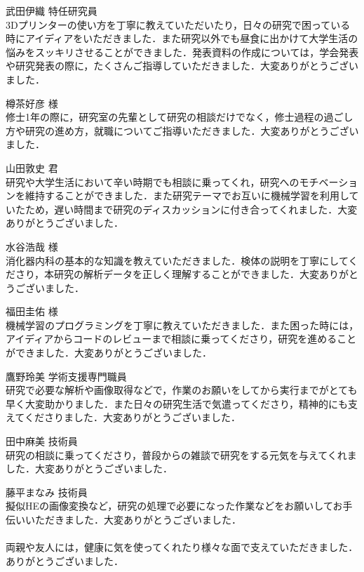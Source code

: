 武田伊織 特任研究員\\
3Dプリンターの使い方を丁寧に教えていただいたり，日々の研究で困っている時にアイディアをいただきました．また研究以外でも昼食に出かけて大学生活の悩みをスッキリさせることができました．発表資料の作成については，学会発表や研究発表の際に，たくさんご指導していただきました．大変ありがとうございました．

樽茶好彦 様\\
修士1年の際に，研究室の先輩として研究の相談だけでなく，修士過程の過ごし方や研究の進め方，就職についてご指導いただきました．大変ありがとうございました．

山田敦史 君\\
研究や大学生活において辛い時期でも相談に乗ってくれ，研究へのモチベーションを維持することができました．また研究テーマでお互いに機械学習を利用していたため，遅い時間まで研究のディスカッションに付き合ってくれました．大変ありがとうございました．

水谷浩哉 様\\
消化器内科の基本的な知識を教えていただきました．検体の説明を丁寧にしてくださり，本研究の解析データを正しく理解することができました．大変ありがとうございました．

福田圭佑 様\\
機械学習のプログラミングを丁寧に教えていただきました．また困った時には，アイディアからコードのレビューまで相談に乗ってくださり，研究を進めることができました．大変ありがとうございました．

鷹野玲美 学術支援専門職員\\
研究で必要な解析や画像取得などで，作業のお願いをしてから実行までがとても早く大変助かりました．また日々の研究生活で気遣ってくださり，精神的にも支えてくださりました．大変ありがとうございました．

田中麻美 技術員\\
研究の相談に乗ってくださり，普段からの雑談で研究をする元気を与えてくれました．大変ありがとうございました．

藤平まなみ 技術員\\
擬似HEの画像変換など，研究の処理で必要になった作業などをお願いしてお手伝いいただきました．大変ありがとうございました．
\\
\\
両親や友人には，健康に気を使ってくれたり様々な面で支えていただきました．ありがとうございました．

